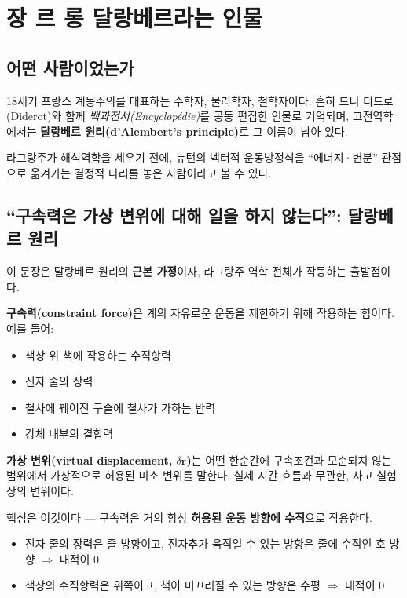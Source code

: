 \documentclass[11pt,a4paper]{article}
\begin{document}
\section{장 르 롱 달랑베르라는 인물}

\subsection{어떤 사람이었는가}

18세기 프랑스 계몽주의를 대표하는 수학자, 물리학자, 철학자이다. 흔히 드니 디드로(Diderot)와 함께 \emph{백과전서(Encyclopédie)}를 공동 편집한 인물로 기억되며, 고전역학에서는 \textbf{달랑베르 원리(d'Alembert's principle)}로 그 이름이 남아 있다.

라그랑주가 해석역학을 세우기 전에, 뉴턴의 벡터적 운동방정식을 ``에너지·변분'' 관점으로 옮겨가는 결정적 다리를 놓은 사람이라고 볼 수 있다.

\subsection{``구속력은 가상 변위에 대해 일을 하지 않는다'': 달랑베르 원리}

이 문장은 달랑베르 원리의 \textbf{근본 가정}이자, 라그랑주 역학 전체가 작동하는 출발점이다.

\textbf{구속력(constraint force)}은 계의 자유로운 운동을 제한하기 위해 작용하는 힘이다. 예를 들어:
\begin{itemize}[leftmargin=*, itemsep=1pt]
  \item 책상 위 책에 작용하는 수직항력
  \item 진자 줄의 장력
  \item 철사에 꿰어진 구슬에 철사가 가하는 반력
  \item 강체 내부의 결합력
\end{itemize}

\textbf{가상 변위(virtual displacement, $\delta \mathbf{r}$)}는 어떤 한순간에 구속조건과 모순되지 않는 범위에서 가상적으로 허용된 미소 변위를 말한다. 실제 시간 흐름과 무관한, 사고 실험상의 변위이다.

핵심은 이것이다 --- 구속력은 거의 항상 \textbf{허용된 운동 방향에 수직}으로 작용한다.

\begin{itemize}[leftmargin=*, itemsep=1pt]
  \item 진자 줄의 장력은 줄 방향이고, 진자추가 움직일 수 있는 방향은 줄에 수직인 호 방향 $\Rightarrow$ 내적이 0
  \item 책상의 수직항력은 위쪽이고, 책이 미끄러질 수 있는 방향은 수평 $\Rightarrow$ 내적이 0
\end{itemize}
\end{document}
